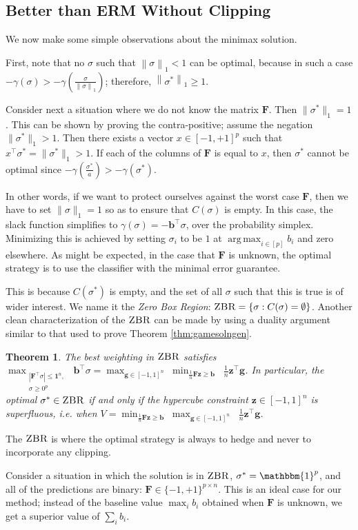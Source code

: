 \documentclass{colt2019} %
\newtheorem{thm}{Theorem}%
\newcommand{\ones}[1]{\mathbbm{1}^{#1}}
\newcommand{\vF}{\mathbf{F}}
\newcommand{\vb}{\mathbf{b}}
\newcommand{\vg}{\mathbf{g}}
\newcommand{\vz}{\mathbf{z}}
\DeclareMathOperator*{\argmax}{arg\,max}
\newcommand{\vnorm}[1]{\left\lVert#1\right\rVert} %
\newcommand{\abs}[1]{\left| #1 \right|}
\newcommand{\zbr}{\textsc{ZBR}}
\newcommand{\lrp}[1]{\left(#1\right)}
\renewcommand{\comment}[3]{\marginpar{\textcolor{#2}{#1: #3}}}
\newcommand{\yoav}[1]{\comment{Yoav}{blue}{#1}}
\begin{document}
\iffalse
\subsection{Better than ERM Without Clipping}
We now make some simple observations about the minimax solution.

First, note that no $\sigma$ such that $\vnorm{\sigma}_1 < 1$ can be optimal, 
because in such a case $-\gamma(\sigma) > -\gamma \lrp{\frac{\sigma}{\vnorm{\sigma}_1}}$; 
therefore, $\vnorm{\sigma^*}_1 \geq 1$.

Consider next a situation where we do not know the matrix $\vF$. 
Then $\|\sigma^*\|_1=1$. This can be shown by proving the contra-positive; 
assume the negation $\|\sigma^*\|_1 > 1$. Then there exists a 
vector $x \in [-1,+1]^p$ such that $x^\top \sigma^* = \|\sigma^*\|_1 > 1$. 
If each of the columns of $\vF$ is equal to $x$, 
then $\sigma^*$ cannot be optimal since 
$-\gamma \lrp{\frac{\sigma^*}{a}} > -\gamma(\sigma^*)$. 

In other words, if we want to protect ourselves against the worst case $\vF$, then
we have to set $\|\sigma\|_1=1$ so as to ensure that $C(\sigma)$ is empty. 
In this case, the slack function simplifies to $\gamma (\sigma) = - \vb^\top \sigma$, 
over the probability simplex. 
Minimizing this is achieved by setting $\sigma_i$ to be $1$ at $\displaystyle \argmax_{i \in [p]} b_i$ and zero
elsewhere. As might be expected, in the case that $\vF$ is unknown, the
optimal strategy is to use the classifier with the minimal error guarantee. 

This is because $C(\sigma^*)$ is empty, 
and the set of all $\sigma$ such that this is true is of wider interest. 
We name it the \emph{Zero Box Region}: $\zbr = \left\{ \sigma : C(\sigma) = \emptyset \right\}$.
Another clean characterization of the $\zbr$ can be made by using a 
duality argument similar to that used to prove Theorem \ref{thm:gamesolngen}. 

\begin{thm}
\label{thm:zbrunconstr}
The best weighting in $\zbr$ satisfies 
$\displaystyle \max_{\substack{ \abs{\vF^\top \sigma} \leq \mathbf{1}^n , \\ \sigma \geq 0^p }} \; \vb^\top \sigma 
= \max_{\vg \in [-1,1]^n} \;\min_{\frac{1}{n} \vF \vz \geq \vb } \;\; \frac{1}{n} \vz^\top \vg  $\;. 
In particular, the optimal $\sigma^* \in \zbr$ if and only if 
the hypercube constraint $\vz \in [-1,1]^{n}$ is superfluous, i.e. when 
$\displaystyle V = \min_{ \frac{1}{n} \vF \vz \geq \vb } \;\max_{\vg \in [-1,1]^n} \;\; \frac{1}{n} \vz^\top \vg $\;.
\end{thm}
The $\zbr$ is where the optimal strategy is always to hedge 
and never to incorporate any clipping. 
\iffalse
\yoav{I don't understand this sentence.}
So Theorem \ref{thm:zbrunconstr} states that the 
hypercube constraint $\vz \in [-1,1]^n$ exactly corresponds 
to the presence of clipping in $\vg$. 
\fi
Consider a situation in which the solution is in $\zbr$, $\sigma^*=\ones{p}$, 
and all of the predictions are binary: $\vF \in \{-1,+1\}^{p \times n}$.
This is an ideal case for our method; instead of the baseline value $\max_i b_i$
obtained when $\vF$ is unknown, we get a superior value of $\sum_i b_i$. 
\end{document}
